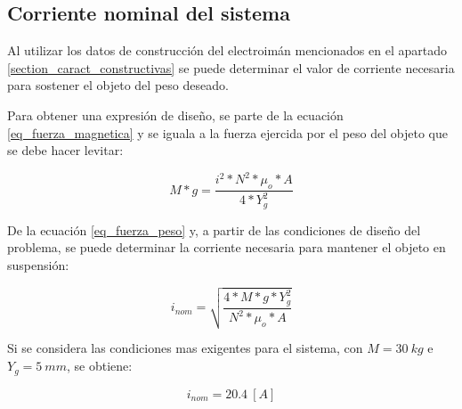 
\subsection{Corriente nominal del sistema}

\noindent Al utilizar los datos de construcción del electroimán mencionados en el apartado \ref{section_caract_constructivas} se puede determinar el valor de corriente necesaria para sostener el objeto del peso deseado.



\noindent Para obtener una expresión de diseño, se parte de la ecuación \ref{eq_fuerza_magnetica} y se iguala a la fuerza ejercida por el peso del objeto que se debe hacer levitar:

\begin{equation}\label{eq_fuerza_peso}
	M*g=\frac{i^{2}*N^{2}*\mu_{o}*A}{4*Y_{g}^{2}}
\end{equation}

\noindent De la ecuación \ref{eq_fuerza_peso} y, a partir de las condiciones de diseño del problema, se puede determinar la corriente necesaria para mantener el objeto en suspensión:

\begin{equation} \label{eq_corriente_peso}
	i_{nom}=\sqrt{\frac{4*M*g*Y_{g}^{2}}{N^{2}*\mu_{o}*A}}
\end{equation}

Si se considera las condiciones mas exigentes para el sistema, con $M=30\:kg$ e $Y_{g}=5\:mm$, se obtiene:

\begin{equation}
	i_{nom}=20.4\:[A]
\end{equation}

